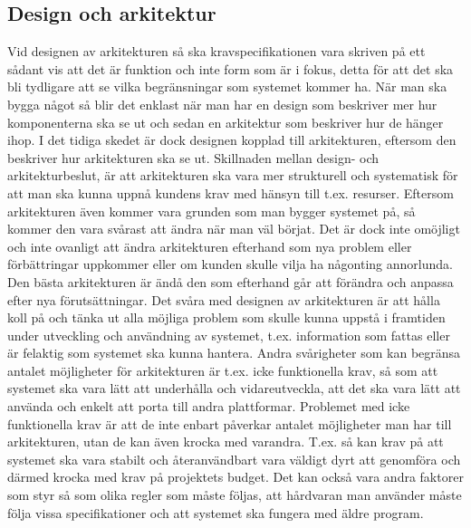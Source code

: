 \subsection{Design och arkitektur}
Vid designen av arkitekturen så ska kravspecifikationen vara skriven på ett sådant vis att det är funktion och inte form som är i fokus, detta för att det ska bli tydligare att se vilka begränsningar som systemet kommer ha. När man ska bygga något så blir det enklast när man har en design som beskriver mer hur komponenterna ska se ut och sedan en arkitektur som beskriver hur de hänger ihop. I det tidiga skedet är dock designen kopplad till arkitekturen, eftersom den beskriver hur arkitekturen ska se ut.
\newline
\newline
Skillnaden mellan design- och arkitekturbeslut, är att arkitekturen ska vara mer strukturell och systematisk för att man ska kunna uppnå kundens krav med hänsyn till t.ex. resurser. Eftersom arkitekturen även kommer vara grunden som man bygger systemet på, så kommer den vara svårast att ändra när man väl börjat. Det är dock inte omöjligt och inte ovanligt att ändra arkitekturen efterhand som nya problem eller förbättringar uppkommer eller om kunden skulle vilja ha någonting annorlunda. Den bästa arkitekturen är ändå den som efterhand går att förändra och anpassa efter nya förutsättningar.
\newline
\newline
Det svåra med designen av arkitekturen är att hålla koll på och tänka ut alla möjliga problem som skulle kunna uppstå i framtiden under utveckling och användning av systemet, t.ex. information som fattas eller är felaktig som systemet ska kunna hantera. Andra svårigheter som kan begränsa antalet möjligheter för arkitekturen är t.ex. icke funktionella krav, så som att systemet ska vara lätt att underhålla och vidareutveckla, att det ska vara lätt att använda och enkelt att porta till andra plattformar. Problemet med icke funktionella krav är att de inte enbart påverkar antalet möjligheter man har till arkitekturen, utan de kan även krocka med varandra. T.ex. så kan krav på att systemet ska vara stabilt och återanvändbart vara väldigt dyrt att genomföra och därmed krocka med krav på projektets budget. Det kan också vara andra faktorer som styr så som olika regler som måste följas, att hårdvaran man använder måste följa vissa specifikationer och att systemet ska fungera med äldre program. \cite[s. 224--225]{set}

